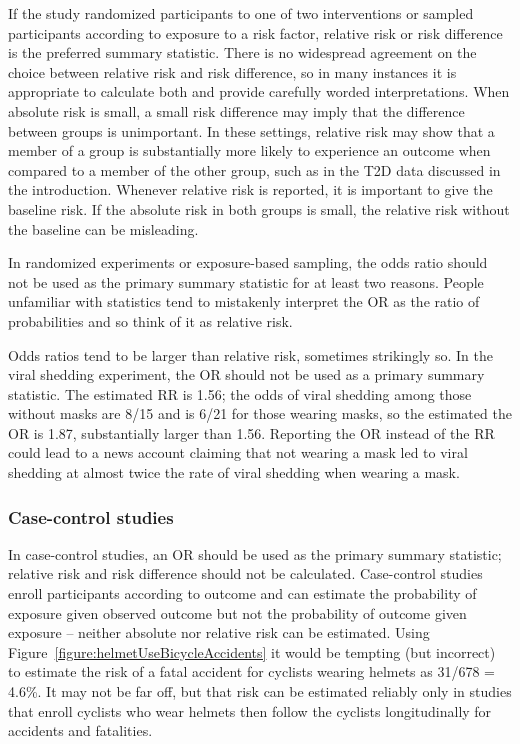 
If the study randomized participants to one of two interventions or sampled participants according to exposure to a risk factor, relative risk or risk difference is the preferred summary statistic.  There is no widespread agreement on the choice between relative risk and risk difference, so in many instances it is appropriate to calculate both and provide carefully worded interpretations. When absolute risk is small, a small risk difference may imply that the difference between groups is unimportant. In these settings, relative risk may show that a member of a group is substantially more likely to experience an outcome when compared to a member of the other group, such as in the T2D data discussed in the introduction.  Whenever relative risk is reported, it is important to give the baseline risk.  If the absolute risk in both groups is small, the relative risk without the baseline can be misleading.

In randomized experiments or exposure-based sampling, the odds ratio should not be used as the primary summary statistic for at least two reasons.  People unfamiliar with statistics tend to mistakenly interpret the OR as the ratio of probabilities and so think of it as relative risk.  

Odds ratios tend to be larger than relative risk, sometimes strikingly so.  In the viral shedding experiment, the OR should not be used as a primary summary statistic. The estimated RR is 1.56; the odds of viral shedding among those without masks are 8/15 and is 6/21 for those wearing masks, so the estimated the OR is 1.87, substantially larger than 1.56. Reporting the OR instead of the RR could lead to a news account claiming that not wearing a mask led to viral shedding at almost twice the rate of viral shedding when wearing a mask.


\subsubsection{Case-control studies}

In case-control studies, an OR should be used as the primary summary statistic; relative risk and risk difference should not be calculated. Case-control studies enroll participants according to outcome and can estimate the probability of exposure given observed outcome but not the probability of outcome given exposure -- neither absolute nor relative risk can be estimated. Using Figure~\ref{figure:helmetUseBicycleAccidents}  it would be tempting (but incorrect) to estimate the risk of a fatal accident for cyclists wearing helmets as 31/678 = 4.6\%.  It may not be far off, but that risk can be estimated reliably only in studies that enroll cyclists who wear helmets then follow the cyclists longitudinally for accidents and fatalities.

